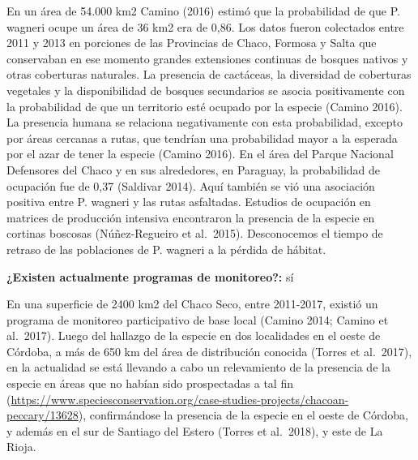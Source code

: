 \documentclass[
  x11names]{article}
\begin{document}
En un área de 54.000 km2 Camino (2016) estimó que la probabilidad de que
P. wagneri ocupe un área de 36 km2 era de 0,86. Los datos fueron
colectados entre 2011 y 2013 en porciones de las Provincias de Chaco,
Formosa y Salta que conservaban en ese momento grandes extensiones
continuas de bosques nativos y otras coberturas naturales. La presencia
de cactáceas, la diversidad de coberturas vegetales y la disponibilidad
de bosques secundarios se asocia positivamente con la probabilidad de
que un territorio esté ocupado por la especie (Camino 2016). La
presencia humana se relaciona negativamente con esta probabilidad,
excepto por áreas cercanas a rutas, que tendrían una probabilidad mayor
a la esperada por el azar de tener la especie (Camino 2016). En el área
del Parque Nacional Defensores del Chaco y en sus alrededores, en
Paraguay, la probabilidad de ocupación fue de 0,37 (Saldivar 2014). Aquí
también se vió una asociación positiva entre P. wagneri y las rutas
asfaltadas. Estudios de ocupación en matrices de producción intensiva
encontraron la presencia de la especie en cortinas boscosas
(Núñez-Regueiro et al.~2015). Desconocemos el tiempo de retraso de las
poblaciones de P. wagneri a la pérdida de hábitat.

\textbf{¿Existen actualmente programas de monitoreo?:} sí

En una superficie de 2400 km2 del Chaco Seco, entre 2011-2017, existió
un programa de monitoreo participativo de base local (Camino 2014;
Camino et al.~2017). Luego del hallazgo de la especie en dos localidades
en el oeste de Córdoba, a más de 650 km del área de distribución
conocida (Torres et al.~2017), en la actualidad se está llevando a cabo
un relevamiento de la presencia de la especie en áreas que no habían
sido prospectadas a tal fin
(\url{https://www.speciesconservation.org/case-studies-projects/chacoan-peccary/13628}),
confirmándose la presencia de la especie en el oeste de Córdoba, y
además en el sur de Santiago del Estero (Torres et al.~2018), y este de
La Rioja.


%
\begin{table}[H]
\centering
\begin{tabular}[t]{>{\raggedright\arraybackslash}m{16cm}>{}m{16cm}}
\toprule
\cellcolor{ceil}{\textcolor{white}{\textbf{\rule{0pt}{14pt}DATOS MORFOMÉTRICOS}}}\\
\bottomrule
\end{tabular}
\end{table}
\end{document}
